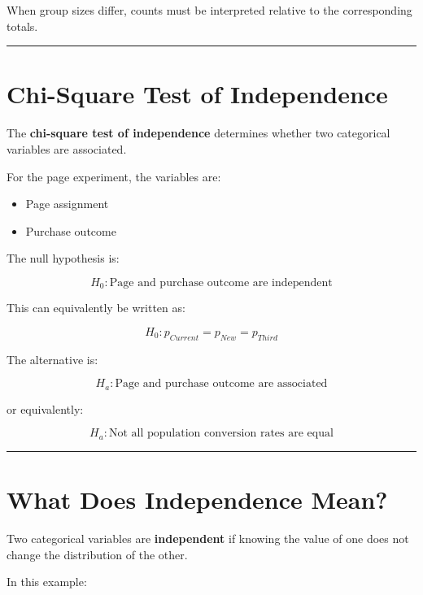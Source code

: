 \documentclass[
  letterpaper,
  DIV=11,
  numbers=noendperiod]{scrreprt}
\providecommand{\tightlist}{%
  \setlength{\itemsep}{0pt}\setlength{\parskip}{0pt}}
\begin{document}
When group sizes differ, counts must be interpreted relative to the
corresponding totals.

\begin{center}\rule{0.5\linewidth}{0.5pt}\end{center}


\chapter{Chi-Square Test of
Independence}\label{chi-square-test-of-independence}

The \textbf{chi-square test of independence} determines whether two
categorical variables are associated.

For the page experiment, the variables are:

\begin{itemize}
\tightlist
\item
  Page assignment
\item
  Purchase outcome
\end{itemize}

The null hypothesis is:

\[
\boxed{
H_0:
\text{Page and purchase outcome are independent}
}
\]

This can equivalently be written as:

\[
\boxed{
H_0:
p_{Current}
=
p_{New}
=
p_{Third}
}
\]

The alternative is:

\[
\boxed{
H_a:
\text{Page and purchase outcome are associated}
}
\]

or equivalently:

\[
H_a:
\text{Not all population conversion rates are equal}
\]

\begin{center}\rule{0.5\linewidth}{0.5pt}\end{center}


\chapter{What Does Independence
Mean?}\label{what-does-independence-mean}

Two categorical variables are \textbf{independent} if knowing the value
of one does not change the distribution of the other.

In this example:
\end{document}
